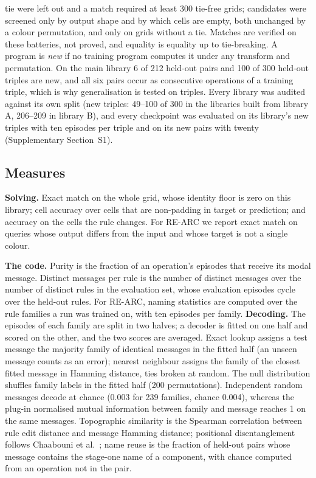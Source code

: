 \documentclass{nature}
\begin{document}
\begin{methods}
tie were left out and a match required at least 300 tie-free grids; candidates were screened only by output shape
and by which cells are empty, both unchanged by a colour permutation, and only on grids without a tie. Matches are
verified on these batteries, not proved, and equality is equality up to tie-breaking. A program is \emph{new} if
no training program computes it under any transform and permutation. On the main library 6 of 212 held-out pairs
and 100 of 300 held-out triples are new, and all six pairs occur as consecutive operations of a training triple,
which is why generalisation is tested on triples. Every library was audited against its own split (new triples:
49--100 of 300 in the libraries built from library A, 206--209 in library B), and every checkpoint was evaluated
on its library's new triples with ten episodes per triple and on its new pairs with twenty (Supplementary
Section~S1).

\subsection{Measures}
\textbf{Solving.} Exact match on the whole grid, whose identity floor is zero on this library; cell
accuracy over cells that are non-padding in target or prediction; and accuracy on the cells the rule
changes. For RE-ARC we report exact match on queries whose output differs from the input and whose
target is not a single colour.

\textbf{The code.} Purity is the fraction of an operation's episodes that receive its modal message.
Distinct messages per rule is the number of distinct messages over the number of distinct rules in
the evaluation set, whose evaluation episodes cycle over the held-out rules. For RE-ARC, naming
statistics are computed over the rule families a run was trained on, with ten episodes per family.
\textbf{Decoding.} The episodes of each family are split in two halves; a decoder is fitted on one half and
scored on the other, and the two scores are averaged. Exact lookup assigns a test message the majority
family of identical messages in the fitted half (an unseen message counts as an error); nearest neighbour
assigns the family of the closest fitted message in Hamming distance, ties broken at random. The null
distribution shuffles family labels in the fitted half (200 permutations). Independent random messages
decode at chance (0.003 for 239 families, chance 0.004), whereas the plug-in normalised mutual information
between family and message reaches 1 on the same messages. Topographic similarity is the Spearman correlation between rule edit
distance and message Hamming distance; positional disentanglement follows Chaabouni et
al.~\cite{chaabouni2020}; name reuse is the fraction of held-out pairs whose message contains the
stage-one name of a component, with chance computed from an operation not in the pair.


\end{methods}
\end{document}
